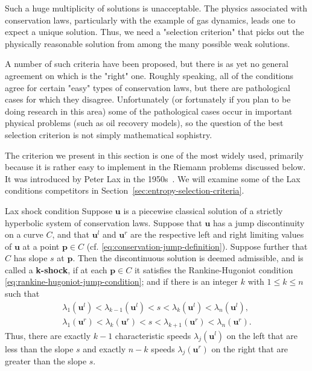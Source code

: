 Such a huge multiplicity of solutions is unacceptable. The physics associated with conservation laws, particularly with the example of gas dynamics, leads one to expect a unique solution. Thus, we need a "selection criterion" that picks out the physically reasonable solution from among the many possible weak solutions.

A number of such criteria have been proposed, but there is as yet no general agreement on which is the "right" one. Roughly speaking, all of the conditions agree for certain "easy" types of conservation laws, but there are pathological cases for which they disagree. Unfortunately (or fortunately if you plan to be doing research in this area) some of the pathological cases occur in important physical problems (such as oil recovery models), so the question of the best selection criterion is not simply mathematical sophistry.

The criterion we present in this section is one of the most widely used, primarily because it is rather easy to implement in the Riemann problems discussed below. It was introduced by Peter Lax in the 1950s~\cite{La}. We will examine some of the Lax condition\textquotesingle s competitors in Section~\ref{sec:entropy-selection-criteria}.

\begin{Definition}{Lax shock condition}
\label{def:lax-shock-condition}
Suppose $\bm{u}$ is a piecewise classical solution of a strictly hyperbolic system of conservation laws. Suppose that $\bm{u}$ has a jump discontinuity on a curve $C$, and that $\bm{u}^l$ and $\bm{u}^r$ are the respective left and right limiting values of $\bm{u}$ at a point $\bm{p}\in C$ (cf. \eqref{eq:conservation-jump-definition}). Suppose further that $C$ has slope $s$ at $\bm{p}$. Then the discontinuous solution is deemed admissible, and is called a \textbf{k-shock}, if at each $\bm{p}\in C$ it satisfies the Rankine-Hugoniot condition \eqref{eq:rankine-hugoniot-jump-condition}; and if there is an integer $k$ with $1\leq k\leq n$ such that
\begin{equation}\label{eq:lax-shock-condition}
\begin{gathered}
\lambda_1(\bm{u}^l)<\lambda_{k-1}(\bm{u}^l)<s<\lambda_k(\bm{u}^l)<\lambda_n(\bm{u}^l),\\
\lambda_1(\bm{u}^r)<\lambda_k(\bm{u}^r)<s<\lambda_{k+1}(\bm{u}^r)<\lambda_n(\bm{u}^r).
\end{gathered}
\end{equation}
Thus, there are exactly $k-1$ characteristic speeds $\lambda_j(\bm{u}^l)$ on the left that are less than the slope $s$ and exactly $n-k$ speeds $\lambda_j(\bm{u}^r)$ on the right that are greater than the slope $s$.
\end{Definition}

